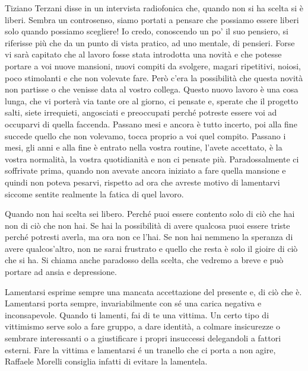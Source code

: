 \documentclass[12pt]{book} %
\begin{document}
Tiziano Terzani disse in un intervista radiofonica che, quando non si ha scelta si è liberi. Sembra un controsenso,
siamo portati a pensare che possiamo essere liberi solo quando possiamo scegliere! Io credo, conoscendo un
po' il suo pensiero, si riferisse più che da un punto di vista pratico, ad uno mentale, di
pensieri. Forse vi sarà capitato che al lavoro fosse stata introdotta una novità e che potesse portare a voi nuove
mansioni, nuovi compiti da svolgere, magari ripetitivi, noiosi, poco stimolanti e che non volevate fare. Però
c'era la possibilità che questa novità non partisse o che venisse data al vostro collega. Questo
nuovo lavoro è una cosa lunga, che vi porterà via tante ore al giorno, ci pensate e, sperate che il progetto salti,
siete irrequieti, angosciati e preoccupati perché potreste essere voi ad occuparvi di quella faccenda. Passano mesi e
ancora è tutto incerto, poi alla fine succede quello che non volevamo, tocca proprio a voi quel compito. Passano i
mesi, gli anni e alla fine è entrato nella vostra routine, l'avete accettato, è la vostra
normalità, la vostra quotidianità e non ci pensate più. Paradossalmente ci soffrivate prima, quando non avevate ancora
iniziato a fare quella mansione e quindi non poteva pesarvi, rispetto ad ora che avreste motivo di lamentarvi siccome
sentite realmente la fatica di quel lavoro.

Quando non hai scelta sei libero. Perché puoi essere contento solo di ciò che hai non di ciò che non hai. Se hai la
possibilità di avere qualcosa puoi essere triste perché potresti averla, ma ora non ce l'hai. Se
non hai nemmeno la speranza di avere qualcos'altro, non ne sarai frustrato e quello che resta è solo il gioire di ciò
che si ha. Si chiama anche paradosso della scelta, che vedremo a breve e può portare ad ansia e depressione.

Lamentarsi esprime sempre una mancata accettazione del presente e, di ciò che è. Lamentarsi porta sempre,
invariabilmente con sé una carica negativa e inconsapevole. Quando ti lamenti, fai di te una vittima. Un certo tipo di
vittimismo serve solo a fare gruppo, a dare identità, a colmare insicurezze o sembrare interessanti o a giustificare i
propri insuccessi delegandoli a fattori esterni. Fare la vittima e lamentarsi é un tranello che ci porta a non agire, Raffaele Morelli consiglia infatti di evitare la lamentela.
\end{document}
